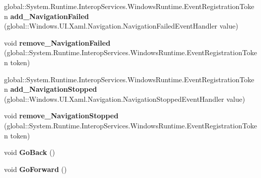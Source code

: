 \begin{DoxyCompactItemize}
\item 
\mbox{\label{interface_windows_1_1_u_i_1_1_xaml_1_1_controls_1_1_i_frame_a468020f0bcda5132e8e4e7a3cd190fc7}} 
global\+::\+System.\+Runtime.\+Interop\+Services.\+Windows\+Runtime.\+Event\+Registration\+Token {\bfseries add\+\_\+\+Navigation\+Failed} (global\+::\+Windows.\+U\+I.\+Xaml.\+Navigation.\+Navigation\+Failed\+Event\+Handler value)
\item 
\mbox{\label{interface_windows_1_1_u_i_1_1_xaml_1_1_controls_1_1_i_frame_a808dc5cb45c82eb7e649575c9f7b74ca}} 
void {\bfseries remove\+\_\+\+Navigation\+Failed} (global\+::\+System.\+Runtime.\+Interop\+Services.\+Windows\+Runtime.\+Event\+Registration\+Token token)
\item 
\mbox{\label{interface_windows_1_1_u_i_1_1_xaml_1_1_controls_1_1_i_frame_ad7cfc7f7bc803572ff9c2acc44ad2cb8}} 
global\+::\+System.\+Runtime.\+Interop\+Services.\+Windows\+Runtime.\+Event\+Registration\+Token {\bfseries add\+\_\+\+Navigation\+Stopped} (global\+::\+Windows.\+U\+I.\+Xaml.\+Navigation.\+Navigation\+Stopped\+Event\+Handler value)
\item 
\mbox{\label{interface_windows_1_1_u_i_1_1_xaml_1_1_controls_1_1_i_frame_adb7fdd2a3d4caa3565de5270aeb78262}} 
void {\bfseries remove\+\_\+\+Navigation\+Stopped} (global\+::\+System.\+Runtime.\+Interop\+Services.\+Windows\+Runtime.\+Event\+Registration\+Token token)
\item 
\mbox{\label{interface_windows_1_1_u_i_1_1_xaml_1_1_controls_1_1_i_frame_a030d64c39f359cacb399064bd14c6360}} 
void {\bfseries Go\+Back} ()
\item 
\mbox{\label{interface_windows_1_1_u_i_1_1_xaml_1_1_controls_1_1_i_frame_aa80a1d8a508afe0e94ed4d473c8bab8f}} 
void {\bfseries Go\+Forward} ()
\item 
\mbox{\label{interface_windows_1_1_u_i_1_1_xaml_1_1_controls_1_1_i_frame_a26a5d60621812443d6a0837e7c36c53e}} 

\end{DoxyCompactItemize}

